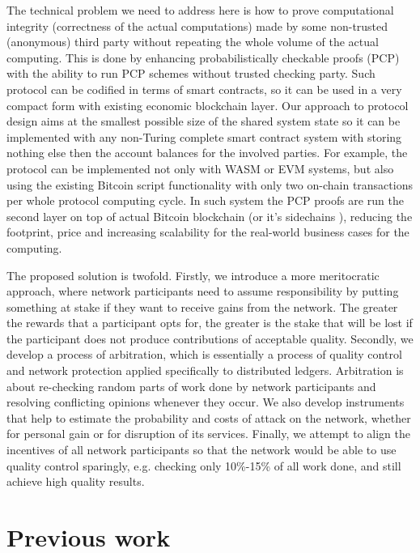 \documentclass[conference]{IEEEtran}
\begin{document}
The technical problem we need to address here is how to prove computational integrity (correctness of the actual computations) made by some non-trusted (anonymous) third party without repeating the whole volume of the actual computing. This is done by enhancing probabilistically checkable proofs (PCP) \cite{pcp, pcpibm} with the ability to run PCP schemes without trusted checking party. Such protocol can be codified in terms of smart contracts, so it can be used in a very compact form with existing economic blockchain layer. Our approach to protocol design aims at the smallest possible size of the shared system state so it can be implemented with any non-Turing complete smart contract system with storing nothing else then the account balances for the involved parties. For example, the protocol can be implemented not only with WASM \cite{webassembly} or EVM \cite{evm} systems, but also using the existing Bitcoin script functionality with only two on-chain transactions per whole protocol computing cycle. In such system the PCP proofs are run the second layer on top of actual Bitcoin blockchain (or it's sidechains \cite{sidechains, typhon}), reducing the footprint, price and increasing scalability for the real-world business cases for the computing. 

The proposed solution is twofold. Firstly, we introduce a more meritocratic approach, where network participants need to assume responsibility by putting something at stake if they want to receive gains from the network. The greater the rewards that a participant opts for, the greater is the stake that will be lost if the participant does not produce contributions of acceptable quality. Secondly, we develop a process of arbitration, which is essentially a process of quality control and network protection applied specifically to distributed ledgers. Arbitration is about re-checking random parts of work done by network participants and resolving conflicting opinions whenever they occur. We also develop instruments that help to estimate the probability and costs of attack on the network, whether for personal gain or for disruption of its services. Finally, we attempt to align the incentives of all network participants so that the network would be able to use quality control sparingly, e.g. checking only 10\%-15\% of all work done, and still achieve high quality results.


\section{Previous work}
\label{previouswork}
\end{document}
